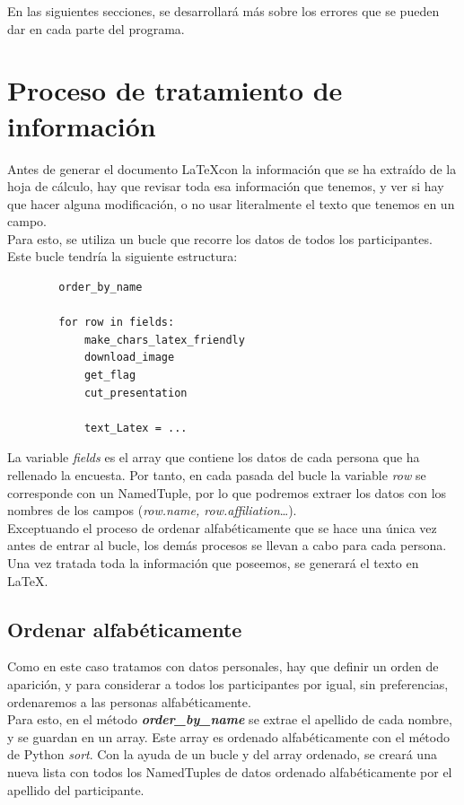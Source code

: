 \documentclass[a4paper, 12pt]{book}
\begin{document}
En las siguientes secciones, se desarrollará más sobre los errores que se pueden dar en cada parte del programa.

\section{Proceso de tratamiento de información}
\label{sec:tratainfo}
Antes de generar el documento \LaTeX con la información que se ha extraído de la hoja de cálculo, hay que revisar toda esa información que tenemos, y ver si hay que hacer alguna modificación, o no usar literalmente el texto que tenemos en un campo.\\

Para esto, se utiliza un bucle que recorre los datos de todos los participantes. Este bucle tendría la siguiente estructura:

\begin{verbatim}
        order_by_name

        for row in fields:
            make_chars_latex_friendly
            download_image
            get_flag
            cut_presentation
    
            text_Latex = ...   
\end{verbatim}

La variable \textit{fields} es el array que contiene los datos de cada persona que ha rellenado la encuesta. Por tanto, en cada pasada del bucle la variable \textit{row} se corresponde con un NamedTuple, por lo que podremos extraer los datos con los nombres de los campos (\textit{row.name, row.affiliation}\ldots).\\

Exceptuando el proceso de ordenar alfabéticamente que se hace una única vez antes de entrar al bucle, los demás procesos se llevan a cabo para cada persona. Una vez tratada toda la información que poseemos, se generará el texto en \LaTeX.


\subsection{Ordenar alfabéticamente}
\label{subsec:orden}
Como en este caso tratamos con datos personales, hay que definir un orden de aparición, y para considerar a todos los participantes por igual, sin preferencias, ordenaremos a las personas alfabéticamente.\\

Para esto, en el método \textbf{\textit{order\_by\_name}} se extrae el apellido de cada nombre, y se guardan en un array. Este array es ordenado alfabéticamente con el método de Python \textit{sort}. Con la ayuda de un bucle y del array ordenado, se creará una nueva lista con todos los NamedTuples de datos ordenado alfabéticamente por el apellido del participante.
\end{document}

